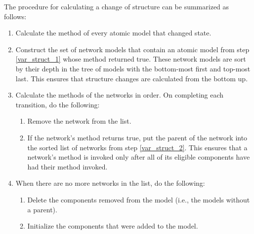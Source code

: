 The procedure for calculating a change of structure can be summarized as follows:
\begin{enumerate}
\item Calculate the  method of every atomic model that changed state.\label{var_struct_1}
\item Construct the set of network models that contain an atomic model from step \ref{var_struct_1} whose  method returned true. These network models are sort by their depth in the tree of models with the bottom-most first and top-most last. This ensures that structure changes are calculated from the bottom up. \label{var_struct_2}
\item Calculate the  methods of the networks in order. On completing each transition, do the following:
\begin{enumerate}
\item Remove the network from the list.
\item If the network's  method returns true, put the parent of the network into the sorted list of networks from step \ref{var_struct_2}. This ensures that a network's  method is invoked only after all of its eligible components have had their  method invoked.
\end{enumerate}
\item When there are no more networks in the list, do the following:
\begin{enumerate}
\item Delete the components removed from the model (i.e., the models without a parent).
\item Initialize the components that were added to the model.
\end{enumerate}
\end{enumerate}


